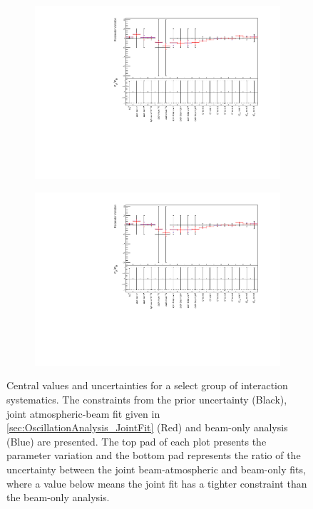 \begin{figure}[h]
  \begin{subfigure}[t]{0.98\textwidth}
    \includegraphics[width=\textwidth, trim={0mm 0mm 0mm 0mm}, clip,page=1]{Figures/OA/FitComparison.pdf}
  \end{subfigure}
  \begin{subfigure}[t]{0.98\textwidth}
    \includegraphics[width=\textwidth, trim={0mm 0mm 0mm 0mm}, clip,page=4]{Figures/OA/FitComparison.pdf}
  \end{subfigure}
  \caption{Central values and \quickmath{1\sigma} uncertainties for a select group of interaction systematics. The constraints from the prior uncertainty (Black), joint atmospheric-beam fit given in \autoref{sec:OscillationAnalysis_JointFit} (Red) and beam-only analysis \cite{Dunne2020-uf, t2k_tn_393} (Blue) are presented. The top pad of each plot presents the parameter variation and the bottom pad represents the ratio of the uncertainty between the joint beam-atmospheric and beam-only fits, where a value below  means the joint fit has a tighter constraint than the beam-only analysis. }
  \label{fig:OscillationAnalysis_ParameterConstraints}
\end{figure}

